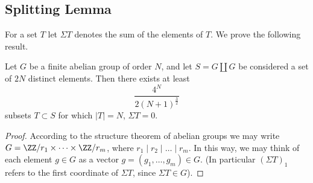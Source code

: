 \subsection{Splitting Lemma}
For a set $T$ let $\Sigma T$ denotes the sum of the elements of $T$.
We prove the following result.
\begin{lemma}
	\label{lem:split}
	Let $G$ be a finite abelian group of order $N$,
	and let $S = G \coprod G$ be considered a set of $2N$
	distinct elements.
	Then there exists at least
	\[ \frac{4^N}{2(N+1)^{\frac32}} \]
	subsets $T \subset S$ for which $|T| = N$,
	$\Sigma T = 0$.
\end{lemma}
\begin{proof}
	According to the structure theorem of abelian groups
	we may write $G = \ZZ/r_1 \times \dots \times \ZZ/r_m$,
	where $r_1 \mid r_2 \mid \dots \mid r_m$.
	In this way, we may think of each element $g \in G$
	as a vector $g = (g_1, \dots, g_m) \in G$.
	(In particular $(\Sigma T)_1$ refers to the first coordinate of $\Sigma T$,
	since $\Sigma T \in G$).


\end{proof}

